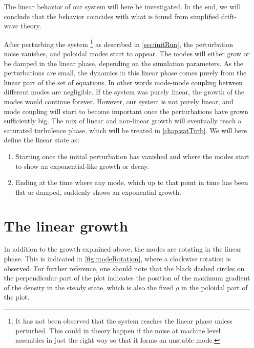 %
The linear behavior of our system will here be investigated.
In the end, we will conclude that the behavior coincides with what is found from simplified drift-wave theory.

After perturbing the system%
\footnote{It has not been observed that the system reaches the linear phase unless perturbed.
    This could in theory happen if the noise at machine level assembles in just the right way so that it forms an unstable mode.}
%
as described in \cref{sec:initRun}, the perturbation noise vanishes, and poloidal modes start to appear.
The modes will either grow or be damped in the linear phase, depending on the simulation parameters.
As the perturbations are small, the dynamics in this linear phase comes purely from the linear part of the set of equations.
In other words mode-mode coupling between different modes are negligible.
If the system was purely linear, the growth of the modes would continue forever.
However, our system is not purely linear, and mode coupling will start to become important once the perturbations have grown sufficiently big.
The mix of linear and non-linear growth will eventually reach a saturated turbulence phase, which will be treated in \cref{chap:satTurb}.
We will here define the linear state as:
%
\begin{enumerate}[noitemsep]
    \item Starting once the initial perturbation has vanished and where the modes start to show an exponential-like growth or decay.
    \item Ending at the time where any mode, which up to that point in time has been flat or damped, suddenly shows an exponential growth.
\end{enumerate}
%

\section{The linear growth}
%
In addition to the growth explained above, the modes are rotating in the linear phase.
This is indicated in \cref{fig:modeRotation}, where a clockwise rotation is observed.
For further reference, one should note that the black dashed circles on the perpendicular part of the plot indicates the position of the maximum gradient of the density in the steady state, which is also the fixed $\rho$ in the poloidal part of the plot.

